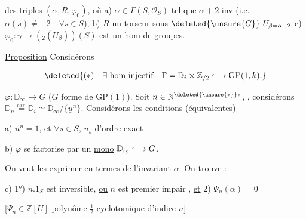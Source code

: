 des triples $(\alpha,R,\varphi_0)$, où a) $\alpha\in\Gamma(S,\mathcal O_S)$ tel que $\alpha+2$ inv (i.e. $\alpha(s)\ne-2\quad\forall s\in S$), b) $R$ un torseur sous  $\deleted{\unsure{G}}\ U_{\beta=\alpha-2}$ c) $\varphi_0:\gamma\longrightarrow({}_2(U_\beta))(S)$ est un hom de groupes.

\uline{Proposition} Considérons    


\[
\deleted{(\ast)\quad\exists\ \text{hom injectif}\quad\Gamma=\mathbb D_i\times\mathbb Z_{/2}\lhook\joinrel\longrightarrow\mathrm{GP}(1,k).}
\]

 $\varphi:\mathbb D_\infty\longrightarrow G$ ($G$ forme de $\mathrm{GP}(1)$).  Soit $n\in\mathbb N^{\deleted{\unsure{*}}*}$, , considérons $\mathbb D_{n}\overset{\text{can}}{=}\mathbb D_i\simeq\mathbb D_\infty/\{\underline u^n\}$. Considérons les conditions (équivalentes)

a) $u^n=1$, et $\forall s\in S$, $u_s$ d'ordre  exact \deleted{[Si $n=0$, il faut dire : $u_s$ d'ordre $\infty$]}

b) $\varphi$ se factorise par un \uline{mono} $\mathbb D_{i_S}\lhook\joinrel\longrightarrow G$.

On veut les exprimer en termes de l'invariant $\alpha$. On trouve : 


c) 1°) $n.1_S$ est inversible, \uline{ou} $n$     est premier impair ,  \uline{et} 2) $\Psi_n(\alpha)=0$

[$\Psi_n\in\mathbb Z[U]$ polynôme $\frac12$ cyclotomique d'indice $n$]
